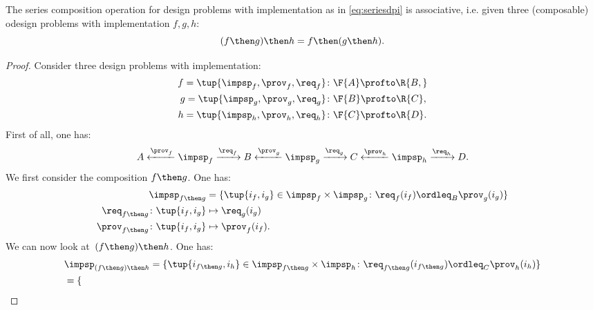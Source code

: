 \begin{lemma}
    The series composition operation for design problems with implementation as in \cref{eq:seriesdpi} is associative, i.e. given three (composable) odesign problems with implementation $f,g,h$:
    \begin{equation}
    (f\then g)
        \then h = f\then (g\then h).
    \end{equation}
\end{lemma}
\begin{proof}
    Consider three design problems with implementation:
    \begin{equation}
        \begin{aligned}
            f=\tup{{\impsp_f, \prov_f, \req_f} }&\colon \F{A} \profto\R{B,}\\
            g=\tup{\impsp_g, \prov_g, \req_g}&\colon \F{B} \profto \R{C},\\
            h=\tup{\impsp_h, \prov_h, \req_h}&\colon \F{C} \profto \R{D}.
        \end{aligned}
    \end{equation}
    First of all, one has:
    \begin{equation}
        A \xleftarrow{\prov_f} \impsp_f \xrightarrow{\req_f} B
        \xleftarrow{\prov_g} \impsp_g \xrightarrow{\req_g} C
        \xleftarrow{\prov_h} \impsp_h \xrightarrow{\req_h} D.
    \end{equation}
    We first consider the composition $f\then g$. One has:
    \begin{equation}
        \begin{aligned}
            \impsp_{f\then g} &= \{
            \tup{i_f,i_g} \in \impsp_f \times \impsp_g \colon
            \req_f(i_f) \ordleq_{B} \prov_g(i_g)
            \}\\
            \req_{f\then g}  \colon  \tup{i_f,i_g} &\mapsto \req_g(i_g) \\
            \prov_{f\then g}  \colon  \tup{i_f,i_g} &\mapsto \prov_f(i_f).
        \end{aligned}
    \end{equation}
    We can now look at~$(f\then g)\then h$. One has:
    \begin{equation}
        \begin{aligned}
            &\impsp_{(f\then g)\then h} = \{
            \tup{i_{f\then g},i_h} \in \impsp_{f\then g} \times \impsp_{h}\colon
            \req_{f\then g}(i_{f\then g}) \ordleq_{C} \prov_h(i_h)
            \}\\
            &=\{

\end{aligned}
\end{equation}
\end{proof}
